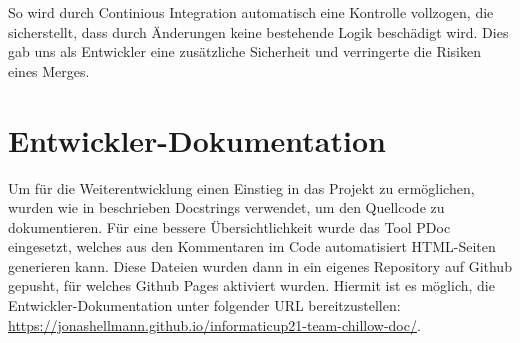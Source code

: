 So wird durch Continious Integration automatisch eine Kontrolle vollzogen, die sicherstellt, dass durch Änderungen
keine bestehende Logik beschädigt wird.
Dies gab uns als Entwickler eine zusätzliche Sicherheit und verringerte die Risiken eines Merges.

\section{Entwickler-Dokumentation}
\label{sec:entwickler-doku}

Um für die Weiterentwicklung einen Einstieg in das Projekt zu ermöglichen, wurden wie in
 beschrieben Docstrings verwendet, um den Quellcode zu dokumentieren.
Für eine bessere Übersichtlichkeit wurde das Tool PDoc eingesetzt, welches aus den Kommentaren im Code automatisiert
HTML-Seiten generieren kann. 
Diese Dateien wurden dann in ein eigenes Repository auf Github gepusht, für welches Github Pages 
aktiviert wurden.
Hiermit ist es möglich, die Entwickler-Dokumentation unter folgender URL bereitzustellen:
\url{https://jonashellmann.github.io/informaticup21-team-chillow-doc/}.
